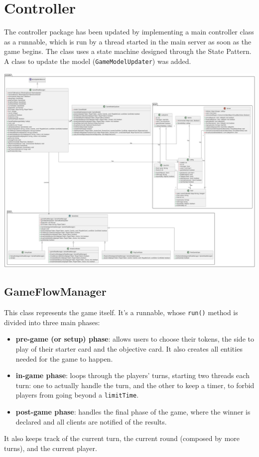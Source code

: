 \documentclass{article}
\begin{document}
\section{Controller}
The controller package has been updated by implementing a main controller class as a runnable, which is run by a thread started in the main server as soon as the game begins.
The class uses a state machine designed through the State Pattern. A class to update the model (\texttt{GameModelUpdater}) was added.
\begin{center}
    \includegraphics[scale=0.25]{pngs/controller}
\end{center}
\subsection{GameFlowManager}
This class represents the game itself. It's a runnable, whose \texttt{run()} method is divided into three main phases:
\begin{itemize}
    \item \textbf{pre-game (or setup) phase}: allows users to choose their tokens, the side to play of their starter card and the objective card.
    It also creates all entities needed for the game to happen.
    \item \textbf{in-game phase}: loops through the players' turns, starting two threads each turn: one to actually handle the turn,
        and the other to keep a timer, to forbid players from going beyond a \texttt{limitTime}.
    \item \textbf{post-game phase}: handles the final phase of the game, where the winner is declared and all clients are notified of the results.
\end{itemize}
It also keeps track of the current turn, the current round (composed by more turns), and the current player.
\end{document}
